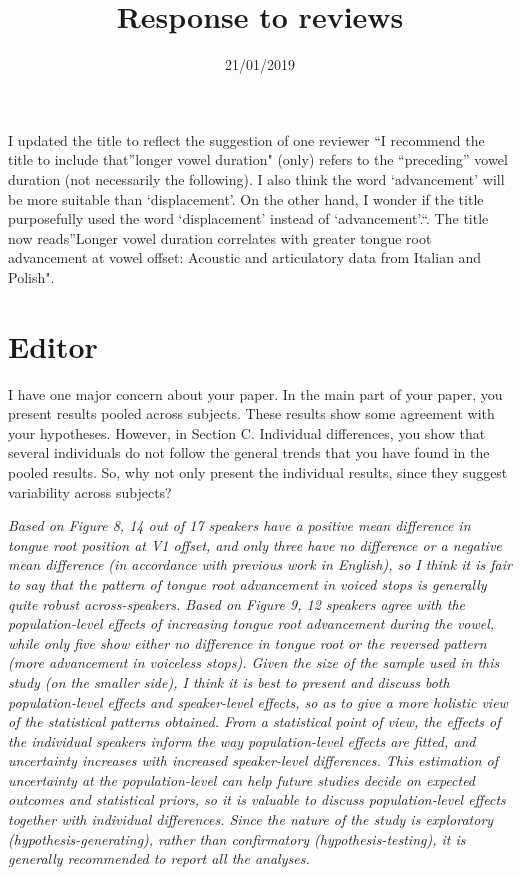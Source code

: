 \documentclass[]{article}
\title{Response to reviews}
\author{}
\date{21/01/2019}
\begin{document}
\maketitle

I updated the title to reflect the suggestion of one reviewer ``I
recommend the title to include that''longer vowel duration" (only)
refers to the ``preceding'' vowel duration (not necessarily the
following). I also think the word `advancement' will be more suitable
than `displacement'. On the other hand, I wonder if the title
purposefully used the word `displacement' instead of `advancement'.``.
The title now reads''Longer vowel duration correlates with greater
tongue root advancement at vowel offset: Acoustic and articulatory data
from Italian and Polish".

\hypertarget{editor}{%
\section{Editor}\label{editor}}

I have one major concern about your paper. In the main part of your
paper, you present results pooled across subjects. These results show
some agreement with your hypotheses. However, in Section C. Individual
differences, you show that several individuals do not follow the general
trends that you have found in the pooled results. So, why not only
present the individual results, since they suggest variability across
subjects?

\begin{adjustwidth}{1cm}{} \textit{
Based on Figure 8, 14 out of 17 speakers have a positive mean difference in tongue root position at V1 offset, and only three have no difference or a negative mean difference (in accordance with previous work in English), so I think it is fair to say that the pattern of tongue root advancement in voiced stops is generally quite robust across-speakers. Based on Figure 9, 12 speakers agree with the population-level effects of increasing tongue root advancement during the vowel, while only five show either no difference in tongue root or the reversed pattern (more advancement in voiceless stops).
Given the size of the sample used in this study (on the smaller side), I think it is best to present and discuss both population-level effects and speaker-level effects, so as to give a more holistic view of the statistical patterns obtained. From a statistical point of view, the effects of the individual speakers inform the way population-level effects are fitted, and uncertainty increases with increased speaker-level differences. This estimation of uncertainty at the population-level can help future studies decide on expected outcomes and statistical priors, so it is valuable to discuss population-level effects together with individual differences. Since the nature of the study is exploratory (hypothesis-generating), rather than confirmatory (hypothesis-testing), it is generally recommended to report all the analyses.
} \end{adjustwidth}
\end{document}
